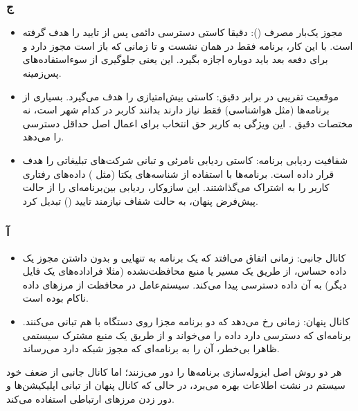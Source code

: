 \subsubsection*{ج}
\begin{itemize}
    \item {مجوز یک‌بار مصرف ():} دقیقا کاستی دسترسی دائمی پس از تایید را هدف گرفته است. با این کار، برنامه فقط در همان نشست و تا زمانی که باز است مجوز دارد و برای دفعه بعد باید دوباره اجازه بگیرد. این یعنی جلوگیری از سوءاستفاده‌های پس‌زمینه.
    \item {موقعیت تقریبی در برابر دقیق:} کاستی بیش‌امتیازی را هدف می‌گیرد. بسیاری از برنامه‌ها (مثل هواشناسی) فقط نیاز دارند بدانند کاربر در کدام شهر است، نه مختصات دقیق . این ویژگی به کاربر حق انتخاب برای اعمال اصل حداقل دسترسی را می‌دهد.
    \item {شفافیت ردیابی برنامه:} کاستی ردیابی نامرئی و تبانی شرکت‌های تبلیغاتی را هدف قرار داده است. برنامه‌ها با استفاده از شناسه‌های یکتا (مثل ) داده‌های رفتاری کاربر را به اشتراک می‌گذاشتند. این سازوکار، ردیابی بین‌برنامه‌ای را از حالت پیش‌فرض پنهان، به حالت شفاف نیازمند تایید () تبدیل کرد.
\end{itemize}


\subsubsection*{آ}
\begin{itemize}
    \item {کانال جانبی:} زمانی اتفاق می‌افتد که یک برنامه به تنهایی و بدون داشتن مجوز یک داده حساس، از طریق یک مسیر یا منبع محافظت‌نشده (مثلا فراداده‌های یک فایل دیگر) به آن داده دسترسی پیدا می‌کند. سیستم‌عامل در محافظت از مرزهای داده ناکام بوده است.
    \item {کانال پنهان:} زمانی رخ می‌دهد که دو برنامه مجزا روی دستگاه با هم تبانی می‌کنند. برنامه‌ای که دسترسی دارد داده را می‌خواند و از طریق یک منبع مشترک سیستمی ظاهرا بی‌خطر، آن را به برنامه‌ای که مجوز شبکه دارد می‌رساند.
\end{itemize}
هر دو روش اصل ایزوله‌سازی برنامه‌ها را دور می‌زنند؛ اما کانال جانبی از ضعف خود سیستم در نشت اطلاعات بهره می‌برد، در حالی که کانال پنهان از تبانی اپلیکیشن‌ها و دور زدن مرزهای ارتباطی استفاده می‌کند.


